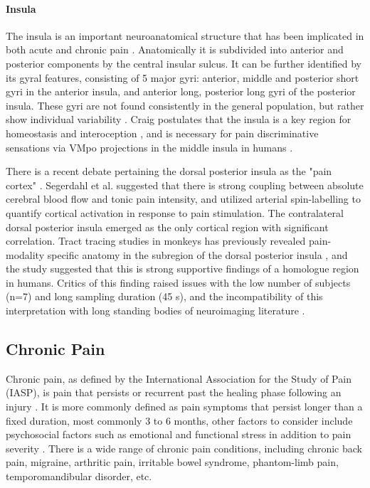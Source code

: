 \paragraph{Insula}

The insula is an important neuroanatomical structure that has been implicated in both acute \cite{Lorenz2005,Starr2009} and chronic pain \cite{May2008,Jensen2016}. Anatomically it is subdivided into anterior and posterior components by the central insular sulcus. It can be further identified by its gyral features, consisting of 5 major gyri: anterior, middle and posterior short gyri in the anterior insula, and anterior long, posterior long gyri of the posterior insula. These gyri are not found consistently in the general population, but rather show individual variability \cite{Rosen2015}. Craig postulates that the insula is a key region for homeostasis and interoception \cite{Craig2003b}, and is necessary for pain discriminative sensations via VMpo projections in the middle insula in humans \cite{Craig2003a}. 

There is a recent debate pertaining the dorsal posterior insula as the "pain cortex" \cite{Segerdahl2015a}. Segerdahl et al. suggested that there is strong coupling between absolute cerebral blood flow and tonic pain intensity, and utilized arterial spin-labelling to quantify cortical activation in response to pain stimulation. The contralateral dorsal posterior insula emerged as the only cortical region with significant correlation. Tract tracing studies in monkeys has previously revealed pain-modality specific anatomy in the subregion of the dorsal posterior insula \cite{Craig2014}, and the study suggested that this is strong supportive findings of a homologue region in humans. Critics of this finding raised issues with the low number of subjects (n=7) and long sampling duration (45 s), and the incompatibility of this interpretation with long standing bodies of neuroimaging literature \cite{Davis2015}. 

\subsection{Chronic Pain}

Chronic pain, as defined by the International Association for the Study of Pain (IASP), is pain that persists or recurrent past the healing phase following an injury \cite{Apkarian2009}. It is more commonly defined as pain symptoms that persist longer than a fixed duration, most commonly 3 to 6 months, other factors to consider include psychosocial factors such as emotional and functional stress in addition to pain severity \cite{Treede2015}. There is a wide range of chronic pain conditions, including chronic back pain, migraine, arthritic pain, irritable bowel syndrome, phantom-limb pain, temporomandibular disorder, etc. 

